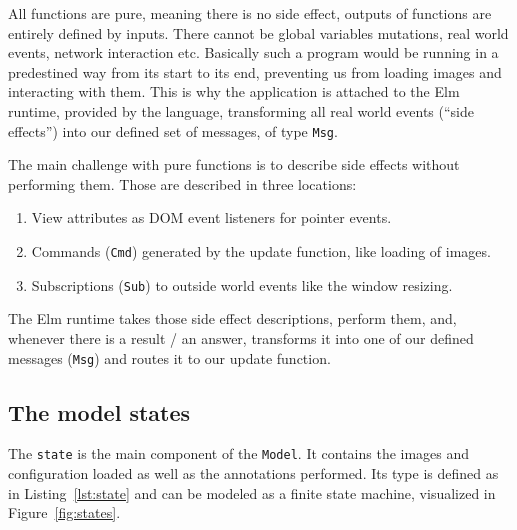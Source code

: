 All functions are pure, meaning there is no side effect,
outputs of functions are entirely defined by inputs.
There cannot be global variables mutations,
real world events, network interaction etc.
Basically such a program would be running in a predestined way
from its start to its end,
preventing us from loading images and interacting with them.
This is why the application is attached to the Elm runtime,
provided by the language, transforming all real world events (``side effects'')
into our defined set of messages, of type \verb|Msg|.

The main challenge with pure functions is
to describe side effects without performing them.
Those are described in three locations:

\begin{enumerate}
\item View attributes as DOM event listeners for pointer events.
\item Commands (\verb|Cmd|) generated by the update function, like loading of images.
\item Subscriptions (\verb|Sub|) to outside world events like the window resizing.
\end{enumerate}

The Elm runtime takes those side effect descriptions,
perform them, and, whenever there is a result / an answer,
transforms it into one of our defined messages (\verb|Msg|)
and routes it to our update function.


\subsection{The model states}

The \verb|state| is the main component of the \verb|Model|.
It contains the images and configuration loaded as well as the annotations performed.
Its type is defined as in Listing~\ref{lst:state}
and can be modeled as a finite state machine, visualized in Figure~\ref{fig:states}.



